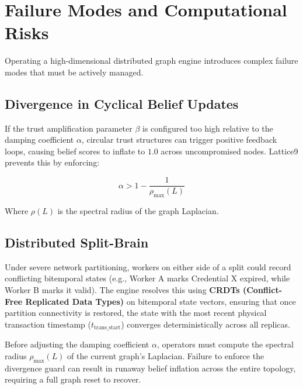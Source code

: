 \documentclass[11pt,a4paper]{article}
\theoremstyle{definition}
\numberwithin{equation}{section}
\begin{document}
\section{Failure Modes and Computational Risks}\label{sec:failure}

Operating a high-dimensional distributed graph engine introduces complex failure modes that must be actively managed.

\subsection{Divergence in Cyclical Belief Updates}\label{subsec:divergence}

If the trust amplification parameter $\beta$ is configured too high relative to the damping coefficient $\alpha$, circular trust structures can trigger positive feedback loops, causing belief scores to inflate to $1.0$ across uncompromised nodes. Lattice9 prevents this by enforcing:

\begin{equation}\label{eq:divergence-guard}
\alpha > 1 - \frac{1}{\rho_{\text{max}}(L)}
\end{equation}

Where $\rho(L)$ is the spectral radius of the graph Laplacian.

\subsection{Distributed Split-Brain}\label{subsec:split-brain}

Under severe network partitioning, workers on either side of a split could record conflicting bitemporal states (e.g., Worker A marks Credential X expired, while Worker B marks it valid). The engine resolves this using \textbf{CRDTs (Conflict-Free Replicated Data Types)} on bitemporal state vectors, ensuring that once partition connectivity is restored, the state with the most recent physical transaction timestamp ($t_{\text{trans\_start}}$) converges deterministically across all replicas.

\begin{computationwarning}
Before adjusting the damping coefficient $\alpha$, operators must compute the spectral radius $\rho_{\max}(L)$ of the current graph's Laplacian. Failure to enforce the divergence guard can result in runaway belief inflation across the entire topology, requiring a full graph reset to recover.
\end{computationwarning}
\end{document}
